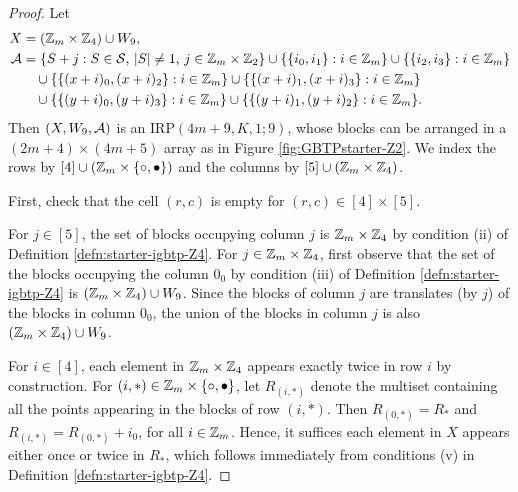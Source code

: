 \documentclass[draft, 11pt]{article}
\begin{document}
\begin{proof}
Let
\begin{align*}
X &= (\ZZ_{m}\times\ZZ_4)\cup W_9, \\
\A &= \{S+j:\text{$S\in \SSS$, $|S|\ne 1$, $j\in\ZZ_{m}\times\ZZ_2$}\}%
\cup\{\{i_0,i_1\}: i\in\ZZ_m\}\cup\{\{i_2,i_3\}: i\in\ZZ_m\}\\
& ~~~ \cup\{\{(x+i)_0,(x+i)_2\}: i\in\ZZ_m\} \cup \{\{(x+i)_1,(x+i)_3\}: i\in\ZZ_m\}\\
& ~~~\cup \{\{(y+i)_0,(y+i)_3\}: i\in\ZZ_m\} \cup \{\{(y+i)_1,(y+i)_2\}: i\in\ZZ_m\}.
\end{align*}
Then $(X,W_9,\mathcal A)$ is an IRP$(4m+9,K,1;9)$, whose blocks can be arranged in a
$(2m+4)\times (4m+5)$ array as in Figure \ref{fig:GBTPstarter-Z2}.
We index the rows by $[4]\cup (\mathbb Z_m\times\{\circ,\bullet\})$ and the columns by $[5]\cup(\mathbb Z_m\times \mathbb Z_4)$.

First, check that the cell $(r,c)$ is empty for $(r,c)\in [4]\times [5]$.

For $j\in[5]$, the set of blocks occupying column $j$ is $\mathbb Z_m\times\mathbb Z_4$
by condition (ii) of Definition \ref{defn:starter-igbtp-Z4}.
For $j\in \mathbb Z_m\times \mathbb Z_4$, first observe that 
the set of the blocks occupying the column $0_0$ by condition (iii) of Definition \ref{defn:starter-igbtp-Z4} 
is $(\mathbb Z_m\times \mathbb Z_4)\cup W_9$. 
Since the blocks of column $j$ are translates (by $j$) of the blocks in column $0_0$, 
the union of the blocks in column $j$ is also $(\mathbb Z_m\times \mathbb Z_4)\cup W_9$.

For $i\in[4]$, each element in $\mathbb Z_m\times \mathbb Z_4$ appears exactly twice in row $i$ by construction.
For $(i,*)\in\mathbb Z_m\times\{\circ,\bullet\}$, let $R_{(i,*)}$ denote the multiset containing all the points
appearing in the blocks of row $(i,*)$. Then  $R_{(0,*)}=R_*$ and $R_{(i,*)} = R_{(0,*)}+i_0$,
for all $i\in\mathbb Z_{m}$. 
Hence, it suffices each element in $X$ appears either once or twice in $R_*$,
which follows immediately from conditions (v) in Definition \ref{defn:starter-igbtp-Z4}.
\end{proof}
\end{document}
